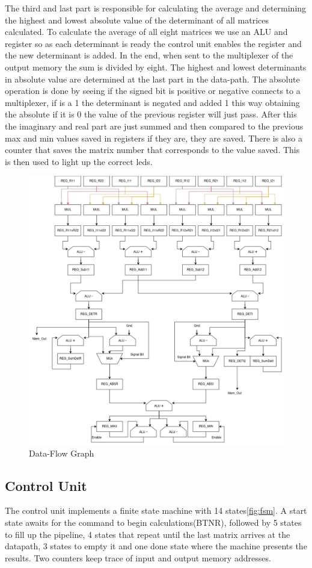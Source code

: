 \documentclass[12pt]{article}
\begin{document}
The third and last part is responsible for calculating the average and determining the highest and lowest absolute value of the determinant of all matrices calculated. To calculate the average of all eight matrices we use an ALU and register so as each determinant is ready the control unit enables the register and the new determinant is added. In the end, when sent to the multiplexer of the output memory the sum is divided by eight. The highest and lowest determinants in absolute value are determined at the last part in the data-path. The absolute operation is done by seeing if the signed bit is positive or negative connects to a multiplexer, if is a 1 the determinant is negated and added 1 this way obtaining the absolute if it is 0 the value of the previous register will just pass. After this the imaginary and real part are just summed and then compared to the previous max and min values saved in registers if they are, they are saved. There is also a counter that saves the matrix number that corresponds to the value saved. This is then used to light up the correct leds. 
\begin{figure}[H]
	\centering
	\includegraphics[width=0.75\linewidth]{images/DataPath.png}
	\caption{Data-Flow Graph}
	\label{fig:datapath}
\end{figure}


\subsection{Control Unit}
The control unit implements a finite state machine with 14 states\ref{fig:fsm}. A start state awaits for the command to begin calculations(BTNR), followed by 5 states to fill up the pipeline, 4 states that repeat until the last matrix arrives at the datapath, 3 states to empty it and one done state where the machine presents the results.
Two counters keep trace of input and output memory addresses.
\end{document}

